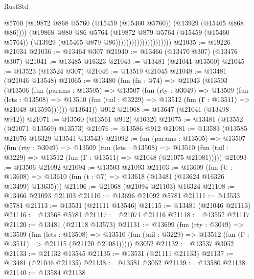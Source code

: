 \begin{lexlean}{RustStd}
\begin{coremodule}
                                        @5760
                                        (@19872
                                          @868
                                          @5760
                                          (@15459 (@15460 @5760))
                                          (@13929 (@15465 @868 @86))))
                                      (@19868
                                        @880
                                        @86
                                        @5764
                                        (@19872
                                          @879
                                          @5764
                                          (@15459 (@15460 @5764))
                                          (@13929 (@15465 @879 @86)))))))))))))))))))))
@21035 := @19226 @21034
@21036 := @13464 @307
@21040 := @13466 (@13470 @307) (@13476 @307)
@21041 := @13485 @16323
@21043 := @13481 (@21041 @13500)
@21045 := @13523 (@13524 @307)
@21046 := @13519 @21045
@21048 := @13481 (@21046 @13548)
@21065 := @13480
    (fun (fn : @74) =>
    @21043
      (@13503
        (@13506
          (fun (params : @13505) =>
          @13507
            (fun (rty : @3049) =>
            @13509
              (fun (lets : @13508) =>
              @13510 (fun (tail : @3229) => @13512 (fun (Γ : @13511) => @21048 @13595))))))
        @13641))
    @912
@21068 := @13647 (@21041 (@13498 @912))
@21071 := @13560 (@13561 @912) @16326
@21075 := @13481 (@13552 (@21071 @13569) @13573)
@21076 := @13586 @912
@21081 := @13583 (@13585 @21076 @16329 @13541 @13543)
@21092 := fun (params : @13505) =>
  @13507
    (fun (rty : @3049) =>
    @13509
      (fun (lets : @13508) =>
      @13510 (fun (tail : @3229) => @13512 (fun (Γ : @13511) => @21048 (@21075 @21081)))))
@21093 := @13506 @21092
@21094 := @13503 @21093
@21103 := @13609
    (fun (U : @13608) => @13610 (fun (t : @7) => @13618 (@13481 (@13624 @16326 @13499) @13635)))
@21106 := @21068 (@21094 @21103) @16324
@21108 := @13466 @21093 @21103
@21110 := @13696 @21092 @5781
@21111 := @13533 @5781
@21113 := @13531 (@21111 @13546)
@21115 := @13481 (@21046 @21113)
@21116 := @13568 @5781
@21117 := @21071 @21116
@21118 := @13552 @21117
@21120 := @13481 (@21118 @13573)
@21131 := @13699
    (fun (rty : @3049) =>
    @13509
      (fun (lets : @13508) =>
      @13510 (fun (tail : @3229) => @13512 (fun (Γ : @13511) => @21115 (@21120 @21081)))))
    @3052
@21132 := @13537 @3052
@21133 := @21132 @13545
@21135 := @13531 (@21111 @21133)
@21137 := @13481 (@21046 @21135)
@21138 := @13581 @3052
@21139 := @13580 @21138
@21140 := @13584 @21138

\end{coremodule}
\end{lexlean}
